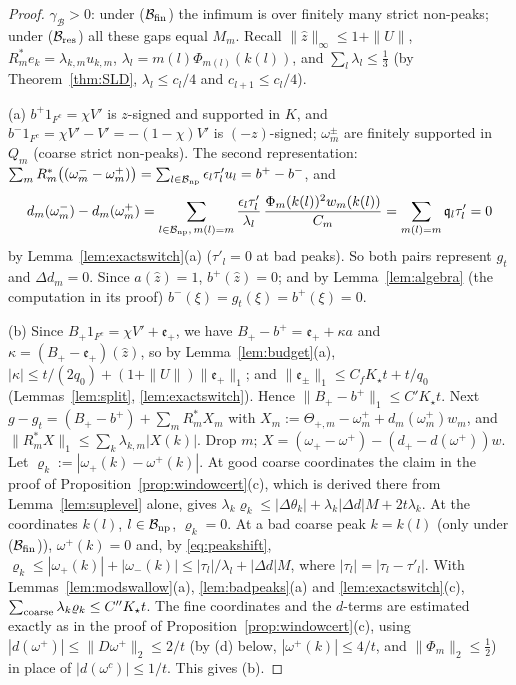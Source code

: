 \documentclass[10pt]{amsart}
\theoremstyle{definition}
\theoremstyle{remark}
\newcommand{\zh}{\hat z}
\begin{document}
\begin{proof}
$\gamma_{\mathcal B}>0$: under ($\mathcal B_{\rm fin}$) the infimum is over
finitely many strict non-peaks; under ($\mathcal B_{\rm res}$) all these gaps
equal $M_m$.  Recall $\|\zh\|_\infty\le1+\|U\|$, $R_m^*e_k=\lambda_{k,m}u_{k,m}$,
$\lambda_l=m(l)\Phi_{m(l)}(k(l))$, and $\sum_l\lambda_l\le\frac13$ (by
Theorem~\ref{thm:SLD}, $\lambda_l\le c_l/4$ and $c_{l+1}\le c_l/4$).

(a) $b^+1_{F^c}=\chi V'$ is $z$-signed and supported in $K$, and
$b^-1_{F^c}=\chi V'-V'=-(1-\chi)V'$ is $(-z)$-signed; $\omega^\pm_m$ are
finitely supported in $Q_m$ (coarse strict non-peaks).  The second
representation: $\sum_mR_m^*\big((\omega^-_m-\omega^+_m)\big)=\sum_{l\in
\mathcal B_{\rm np}}\epsilon_l\tau'_lu_l=b^+-b^-$, and
\[
 d_m(\omega^-_m)-d_m(\omega^+_m)=\sum_{l\in\mathcal B_{\rm np},\,m(l)=m}
 \frac{\epsilon_l\tau'_l}{\lambda_l}\,\frac{\Phi_m(k(l))^2w_m(k(l))}{C_m}=
 \sum_{m(l)=m}\mathfrak q_l\tau'_l=0
\]
by Lemma~\ref{lem:exactswitch}(a) ($\tau'_l=0$ at bad peaks).  So both pairs
represent $g_t$ and $\Delta d_m=0$.  Since $a(\zh)=1$, $b^+(\zh)=0$; and by
Lemma~\ref{lem:algebra} (the computation in its proof)
$b^-(\xi)=g_t(\xi)=b^+(\xi)=0$.

(b) Since $B_+1_{F^c}=\chi V'+\mathfrak e_+$, we have $B_+-b^+=\mathfrak
e_++\kappa a$ and $\kappa=(B_+-\mathfrak e_+)(\zh)$, so by
Lemma~\ref{lem:budget}(a), $|\kappa|\le t/(2q_0)+(1+\|U\|)\|\mathfrak
e_+\|_1$; and $\|\mathfrak e_\pm\|_1\le C_fK_\star t+t/q_0$
(Lemmas~\ref{lem:split}, \ref{lem:exactswitch}).  Hence $\|B_+-b^+\|_1\le
C'K_\star t$.  Next $g-g_t=(B_+-b^+)+\sum_mR_m^*X_m$ with $X_m:=\Theta_{+,m}-
\omega^+_m+d_m(\omega^+_m)w_m$, and $\|R_m^*X\|_1\le\sum_k\lambda_{k,m}|X(k)|$.
Drop $m$; $X=(\omega_+-\omega^+)-(d_+-d(\omega^+))w$.  Let
$\varrho_k:=|\omega_+(k)-\omega^+(k)|$.  At good coarse coordinates the
claim in the proof of Proposition~\ref{prop:windowcert}(c), which is
derived there from Lemma~\ref{lem:suplevel} alone, gives
$\lambda_k\varrho_k\le|\Delta\theta_k|+\lambda_k|\Delta d|M+2t\lambda_k$.  At
the coordinates $k(l)$, $l\in\mathcal B_{\rm np}$, $\varrho_k=0$.  At a bad
coarse peak $k=k(l)$ (only under ($\mathcal B_{\rm fin}$)), $\omega^+(k)=0$
and, by \eqref{eq:peakshift}, $\varrho_k\le|\omega_+(k)|+|\omega_-(k)|\le
|\tau_l|/\lambda_l+|\Delta d|M$, where $|\tau_l|=|\tau_l-\tau'_l|$.  With
Lemmas~\ref{lem:modswallow}(a), \ref{lem:badpeaks}(a) and
\ref{lem:exactswitch}(c), $\sum_{\rm coarse}\lambda_k\varrho_k\le C''K_\star
t$.  The fine coordinates and the $d$-terms are estimated exactly as in the
proof of Proposition~\ref{prop:windowcert}(c), using
$|d(\omega^+)|\le\|D\omega^+\|_2\le2/t$ (by (d) below, $|\omega^+(k)|\le4/t$,
and $\|\Phi_m\|_2\le\frac12$) in place of $|d(\omega^c)|\le1/t$.  This
gives (b).


\end{proof}
\end{document}
